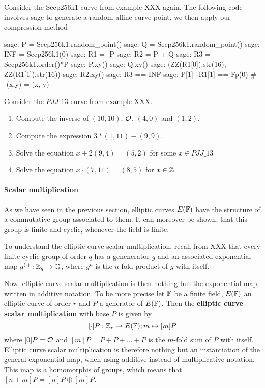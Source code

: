 \begin{example}
Consider the Secp256k1 curve from example XXX again. The following code involves sage to generate a random affine curve point, we then apply our compression method
\begin{sagecommandline}
sage: P = Secp256k1.random_point()
sage: Q = Secp256k1.random_point()
sage: INF = Secp256k1(0)
sage: R1 = -P
sage: R2 = P + Q
sage: R3 = Secp256k1.order()*P
sage: P.xy()
sage: Q.xy()
sage: (ZZ(R1[0]).str(16), ZZ(R1[1]).str(16))
sage: R2.xy()
sage: R3 == INF
sage: P[1]+R1[1] == Fp(0) # -(x,y) = (x,-y)
\end{sagecommandline}
\end{example}
\begin{exercise}
Consider the $\mathit{PJJ\_13}$-curve from example XXX.
\begin{enumerate}
\item Compute the inverse of $(10,10)$, $\mathcal{O}$, $(4,0)$ and $(1,2)$.
\item Compute the expression $3*(1,11) - (9,9)$.
\item Solve the equation $x + 2(9,4) = (5,2) $ for some $x\in \mathit{PJJ\_13}$
\item Solve the equation $x\cdot (7,11) = (8,5)$ for $x\in \mathbb{Z}$
\end{enumerate}
\end{exercise}
\paragraph{Scalar multiplication}
As we have seen in the previous section, elliptic curves $E(\mathbb{F})$ have the structure of a commutative group associated to them. It can moreover be shown, that this group is finite and cyclic, whenever the field is finite.

To understand the elliptic curve scalar multiplication, recall from XXX that every finite cyclic group of order $q$ has a genenerator $g$ and an associated exponential map $g^{(\cdot)}: \mathbb{Z}_q \to \mathbb{G}$, where $g^n$ is the $n$-fold product of $g$ with itself.

Now, elliptic curve scalar multiplication is then nothing but the exponential map, written in additive notation. To be more precise let $\mathbb{F}$ be a finite field, $E(\mathbb{F})$ an elliptic curve of order $r$ and $P$ a generator of $E(\mathbb{F})$. Then the \textbf{elliptic curve scalar multiplication} with base $P$ is given by
$$
[\cdot]P: \mathbb{Z}_r \to E(\mathbb{F}); m \mapsto [m]P
$$
where $[0]P = \mathcal{O}$ and $[m]P = P+P+\ldots + P$ is the $m$-fold sum of $P$ with itself. Elliptic curve scalar multiplication is therefore nothing but an instantiation of the general exponential map, when using additive instead of multiplicative notation. This map is a homomorphis of groups, which means that $[n+m]P = [n]P \oplus [m]P$.

